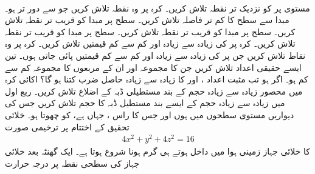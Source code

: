 \\
مستوی  پر  کو  نزدیک تر نقطہ تلاش کریں۔
کرہ   پر وہ نقطہ تلاش کریں جو  سے  دور تر ہو۔
مبدا سے سطح  کا کم تر فاصلہ تلاش کریں۔
سطح  پر مبدا کو قریب تر نقطہ تلاش کریں۔
سطح  پر مبدا کو قریب تر نقطہ تلاش کریں۔
سطح  پر مبدا کو قریب تر نقطہ تلاش کریں۔
کرہ  پر کی زیادہ سے زیادہ اور کم سے کم قیمتیں تلاش کریں۔
کرہ  پر وہ نقاط تلاش کریں جن پر  کی زیادہ سے زیادہ اور کم سے کم قیمتیں پائی جاتی ہوں۔
تین ایسے حقیقی اعداد تلاش کریں جن کا مجموعہ   اور ان کے مربعوں کا مجموعہ کم سے کم ہو۔ 
اگر  ہو تب مثبت اعداد  ،  اور  کا زیادہ سے زیادہ حاصل ضرب کتنا ہو گا؟
اکائی کرہ میں محصور   زیادہ سے زیادہ حجم کے  بند مستطیلی ڈبہ کے اضلاع تلاش کریں۔
ربع اول میں  زیادہ سے زیادہ حجم کے ایسے بند  مستطیل ڈبہ کا حجم تلاش کریں جس کی دیواریں مستوی سطحوں میں ہوں اور جس کا راس ، جہاں  ہے، کو چھوتا ہو۔
خلائی تحقیق کے اختتام  پر ترخیمی  صورت
\begin{align*}
4x^2+y^2+4z^2=16
\end{align*}
کا خلائی جہاز  زمینی ہوا میں داخل ہوتے ہی گرم ہونا شروع ہوتا ہے۔ ایک گھنٹہ بعد  خلائی جہاز کی سطحی  نقطہ  پر درجہ حرارت
